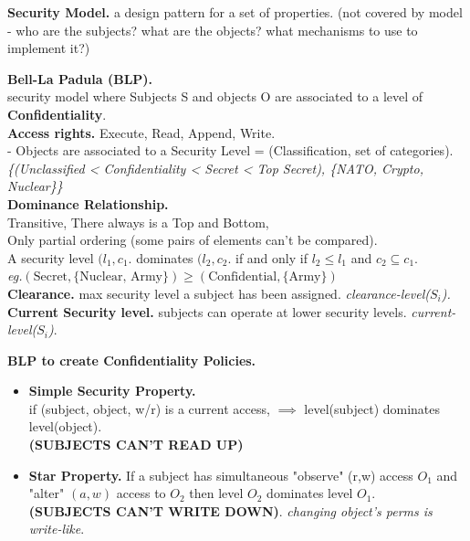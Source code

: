 \documentclass[main.tex]{subfiles}
\begin{document}
\begin{minipage}[t]{0.495\textwidth}
	\textbf{Security Model.} a design pattern for a set of properties. (\warning not covered by model - who are the subjects? what are the objects? what mechanisms to use to implement it?)
	\hline
	\begin{minipage}[t]{0.5\textwidth}
		\textbf{Bell-La Padula (BLP).} \\security model where Subjects S and objects O are associated to a level of \textbf{Confidentiality}. \\
		\textbf{Access rights.} Execute, Read, Append, Write.\\
		- Objects are associated to a Security Level = (Classification, {set of categories}).\\
		\textit{\{(Unclassified < Confidentiality < Secret < Top Secret), \{NATO, Crypto, Nuclear\}\}}\\
		\textbf{Dominance Relationship.} \\
		Transitive, There always is a Top and Bottom, \\Only partial ordering (some pairs of elements can't be compared). \\
		A security level $(l_1, c_1.$ dominates $(l_2, c_2.$ if and only if $l_{2} \leq l_{1}$ and $c_{2} \subseteq c_{1}$.\\
		\textit{eg.$(\text{Secret}, \{ \text{Nuclear, Army} \}) \geq (\text{Confidential}, \{ \text{Army} \})$}\\
		\textbf{Clearance.} max security level a subject has been assigned. \textit{clearance-level($S_i$).}\\
		\textbf{Current Security level.} subjects can operate at lower security levels. \textit{current-level($S_{i}$)}.
	\end{minipage}
	\begin{minipage}[t]{0.5\textwidth}
		\textbf{BLP to create Confidentiality Policies.}
		\begin{itemize}[itemsep=2pt]
			\item[] \textbf{Simple Security Property.}\\
			      if (subject, object, w/r) is a current access, $\implies$ level(subject) dominates level(object). \\\textbf{(SUBJECTS CAN'T READ UP)}
			\item[] \textbf{Star Property.} If a subject has simultaneous "observe" (r,w) access $O_{1}$ and "alter" $(a, w)$  access to $O_2$ then level $O_2$ dominates level $O_1$.\\
			      \textbf{(SUBJECTS CAN'T WRITE DOWN)}. \textit{changing object's perms is write-like}.

\end{itemize}
\end{minipage}
\end{minipage}
\end{document}
